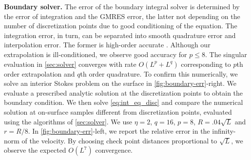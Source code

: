 \textbf{Boundary solver. }
The error of the boundary integral solver is determined
by the error of integration and the GMRES error, the latter not depending on the number of discretization points due to good conditioning of the equation.  The integration error, in turn, can be separated into smooth quadrature error and interpolation error. The former is  high-order accurate \cite{trefethen2013approximation}.
Although our extrapolation is ill-conditioned, we observe good accuracy for $p\leq 8$. The singular evaluation in \cref{sec:solver} converges with rate
$O(L^p + L^q)$ corresponding to $p$th order extrapolation and $q$th
order quadrature.
To confirm this numerically, we solve an interior Stokes problem on the
surface in \cref{fig:boundary-err}-right.
We evaluate a prescribed analytic solution at the discretization
points to obtain the boundary condition.
We then solve \cref{eq:int_eq_disc} and compare the numerical
solution at on-surface samples different from discretization points, evaluated using the algorithms of \cref{sec:solver}. 
We use $\eta =2$, $q=16$, $p=8$, $R=.04\sqrt{L}$ and $r = R/8$.
In \cref{fig:boundary-err}-left, we report the relative error in the
infinity-norm of the velocity.
By choosing check point distances proportional to $\sqrt{L}$,
we observe the expected $O(L^7)$ convergence.
